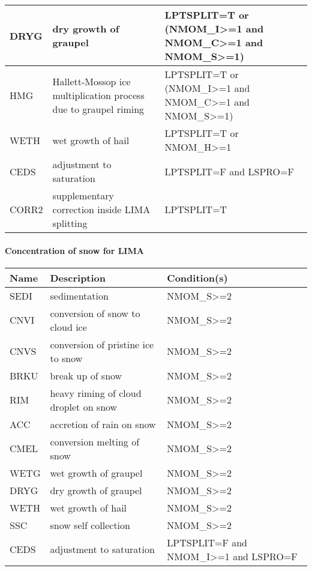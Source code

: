 \begin{longtable} {|p{}|p{}|p{}|}
DRYG   & dry growth of graupel                          & LPTSPLIT=T or (NMOM\_I>=1 and NMOM\_C>=1 and NMOM\_S>=1) \\\hline
HMG    & Hallett-Mossop ice multiplication process due to graupel riming & LPTSPLIT=T or (NMOM\_I>=1 and NMOM\_C>=1 and NMOM\_S>=1) \\\hline
WETH   & wet growth of hail                             & LPTSPLIT=T or NMOM\_H>=1 \\\hline
CEDS   & adjustment to saturation                       & LPTSPLIT=F and LSPRO=F \\\hline
CORR2  & supplementary correction inside LIMA splitting & LPTSPLIT=T \\\hline
\end{longtable}

\paragraph{Concentration of snow for LIMA}
\mbox{} %

\begin{longtable} {|p{}|p{}|p{}|}
\hline
Name & Description & Condition(s) \\
\hline \hline
\endhead
SEDI   & sedimentation                                  & NMOM\_S>=2 \\\hline
CNVI   & conversion of snow to cloud ice                & NMOM\_S>=2 \\\hline
CNVS   & conversion of pristine ice to snow             & NMOM\_S>=2 \\\hline
BRKU   & break up of snow                               & NMOM\_S>=2 \\\hline
RIM    & heavy riming of cloud droplet on snow          & NMOM\_S>=2 \\\hline
ACC    & accretion of rain on snow                      & NMOM\_S>=2 \\\hline
CMEL   & conversion melting of snow                     & NMOM\_S>=2 \\\hline
WETG   & wet growth of graupel                          & NMOM\_S>=2 \\\hline
DRYG   & dry growth of graupel                          & NMOM\_S>=2 \\\hline
WETH   & wet growth of hail                             & NMOM\_S>=2 \\\hline
SSC    & snow self collection                           & NMOM\_S>=2 \\\hline
CEDS   & adjustment to saturation                       & LPTSPLIT=F and NMOM\_I>=1 and LSPRO=F \\\hline
\end{longtable}

